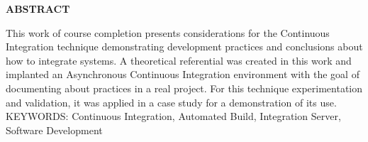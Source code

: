 \begin{center}
\textbf{ABSTRACT}
\end{center}

\singlespacing

\noindent This work of course completion presents considerations for the Continuous Integration technique demonstrating development practices and conclusions about how to integrate systems. A theoretical referential was created in this work and implanted an Asynchronous Continuous Integration environment with the goal of documenting about practices in a real project. For this technique experimentation and validation, it was applied in a case study for a demonstration of its use. \\

\noindent KEYWORDS: Continuous Integration, Automated Build, Integration Server, Software Development
